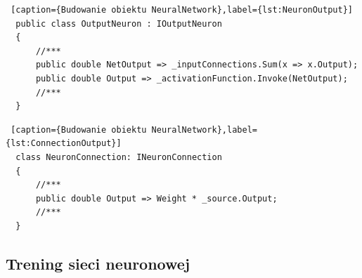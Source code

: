 \begin{lstlisting} [caption={Budowanie obiektu NeuralNetwork},label={lst:NeuronOutput}]
  public class OutputNeuron : IOutputNeuron
  {
      //***
      public double NetOutput => _inputConnections.Sum(x => x.Output);
      public double Output => _activationFunction.Invoke(NetOutput);
      //***
  }
\end{lstlisting}


\begin{lstlisting} [caption={Budowanie obiektu NeuralNetwork},label={lst:ConnectionOutput}]
  class NeuronConnection: INeuronConnection
  {
      //***
      public double Output => Weight * _source.Output;
      //***
  }
\end{lstlisting}

\subsection{Trening sieci neuronowej}














